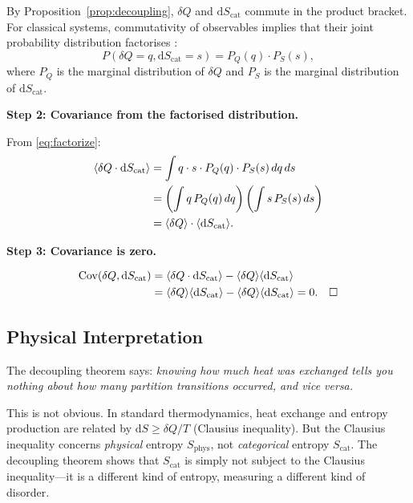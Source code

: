 \documentclass[twocolumn,10pt]{article}
\newcommand{\Scat}{S_{\mathrm{cat}}}
\newcommand{\Sphys}{S_{\mathrm{phys}}}
\newcommand{\dQ}{\delta Q}
\newcommand{\dS}{\mathrm{d}S}
\newcommand{\Cov}{\mathrm{Cov}}
\begin{document}
By Proposition~\ref{prop:decoupling}, $\dQ$ and $\dS_{\mathrm{cat}}$ commute in the product bracket. For classical systems, commutativity of observables implies that their joint probability distribution factorises \citep{gibbs1902}:
\begin{equation}
    P(\dQ = q, \dS_{\mathrm{cat}} = s) = P_Q(q) \cdot P_S(s),
    \label{eq:factorize}
\end{equation}
where $P_Q$ is the marginal distribution of $\dQ$ and $P_S$ is the marginal distribution of $\dS_{\mathrm{cat}}$.

\textbf{Step 2: Covariance from the factorised distribution.}

From \eqref{eq:factorize}:
\begin{align}
    \langle \dQ \cdot \dS_{\mathrm{cat}} \rangle &= \int q \cdot s \cdot P_Q(q) \cdot P_S(s) \, dq \, ds \notag\\
    &= \left(\int q \, P_Q(q) \, dq\right)\left(\int s \, P_S(s) \, ds\right) \notag\\
    &= \langle \dQ \rangle \cdot \langle \dS_{\mathrm{cat}} \rangle.
    \label{eq:product_expectation}
\end{align}

\textbf{Step 3: Covariance is zero.}

\begin{align}
    \Cov(\dQ, \dS_{\mathrm{cat}}) &= \langle \dQ \cdot \dS_{\mathrm{cat}} \rangle - \langle \dQ \rangle \langle \dS_{\mathrm{cat}} \rangle \notag\\
    &= \langle \dQ \rangle \langle \dS_{\mathrm{cat}} \rangle - \langle \dQ \rangle \langle \dS_{\mathrm{cat}} \rangle = 0. \quad \square
\end{align}

\subsection{Physical Interpretation}

The decoupling theorem says: \emph{knowing how much heat was exchanged tells you nothing about how many partition transitions occurred, and vice versa.}

This is not obvious. In standard thermodynamics, heat exchange and entropy production are related by $\dS \geq \dQ/T$ (Clausius inequality). But the Clausius inequality concerns \emph{physical} entropy $\Sphys$, not \emph{categorical} entropy $\Scat$. The decoupling theorem shows that $\Scat$ is simply not subject to the Clausius inequality---it is a different kind of entropy, measuring a different kind of disorder.
\end{document}
